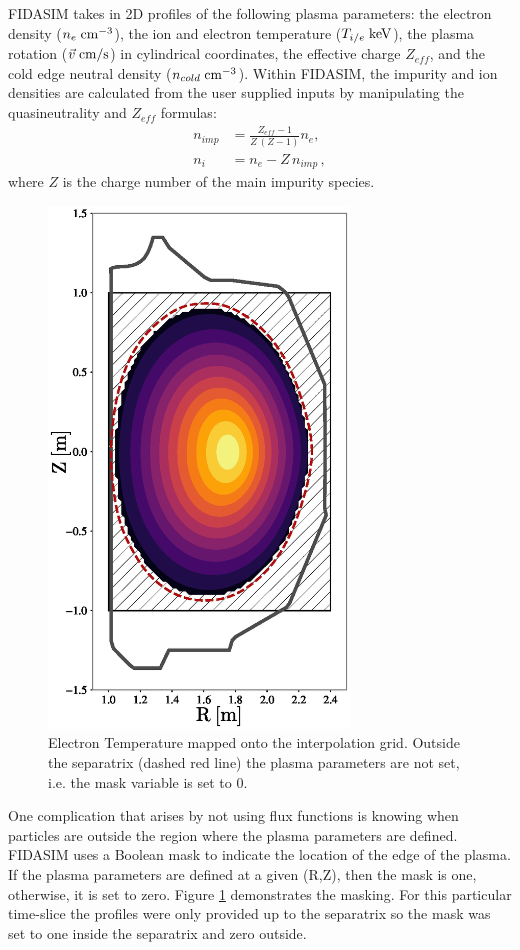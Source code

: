 FIDASIM takes in 2D profiles of the following plasma parameters: the electron density ($n_e\;\rm{cm^{-3}}$), the ion and electron temperature ($T_{i/e}\;\rm{keV}$), the plasma rotation ($\vec{v}\;\rm{cm/s}$) in cylindrical coordinates, the effective charge $Z_{eff}$, and the cold edge neutral density ($n_{cold}\;\rm{cm^{-3}}$). Within FIDASIM, the impurity and ion densities are calculated from the user supplied inputs by manipulating the quasineutrality and $Z_{eff}$ formulas:
\begin{equation}
\begin{split}
    n_{imp} &= \frac{Z_{eff} - 1}{Z\,(Z-1)} n_e, \\
    n_i &= n_e - Z\,n_{imp}\,,
\end{split}
\end{equation}
where $Z$ is the charge number of the main impurity species.
\begin{figure}[h!]
    \centering
    \includegraphics[width=8cm]{figures/te_cross_section.eps}
    \caption{Electron Temperature mapped onto the interpolation grid. Outside the separatrix (dashed red line) the plasma parameters are not set, i.e. the mask variable is set to 0.}
    \label{fig:te_mask}
\end{figure}
One complication that arises by not using flux functions is knowing when particles are outside the region where the plasma parameters are defined. FIDASIM uses a Boolean mask to indicate the location of the edge of the plasma. If the plasma parameters are defined at a given (R,Z), then the mask is one, otherwise, it is set to zero. Figure \ref{fig:te_mask} demonstrates the masking. For this particular time-slice the profiles were only provided up to the separatrix so the mask was set to one inside the separatrix and zero outside.

